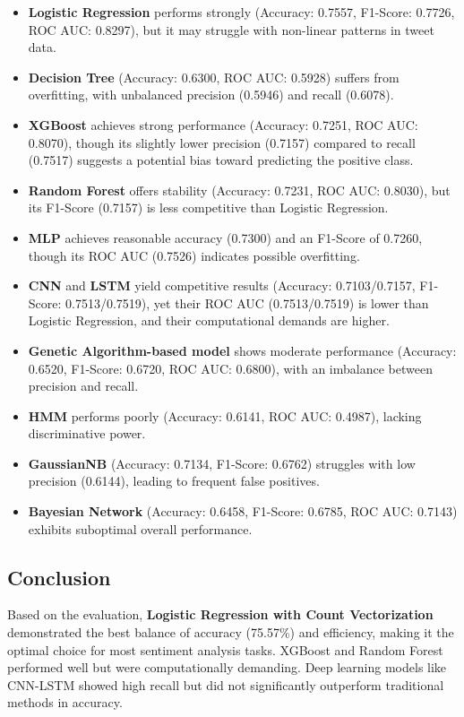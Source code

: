 \begin{itemize}
    \item \textbf{Logistic Regression} performs strongly (Accuracy: 0.7557, F1-Score: 0.7726, ROC AUC: 0.8297), but it may struggle with non-linear patterns in tweet data.
    \item \textbf{Decision Tree} (Accuracy: 0.6300, ROC AUC: 0.5928) suffers from overfitting, with unbalanced precision (0.5946) and recall (0.6078).
    \item \textbf{XGBoost} achieves strong performance (Accuracy: 0.7251, ROC AUC: 0.8070), though its slightly lower precision (0.7157) compared to recall (0.7517) suggests a potential bias toward predicting the positive class.
    \item \textbf{Random Forest} offers stability (Accuracy: 0.7231, ROC AUC: 0.8030), but its F1-Score (0.7157) is less competitive than Logistic Regression.
    \item \textbf{MLP} achieves reasonable accuracy (0.7300) and an F1-Score of 0.7260, though its ROC AUC (0.7526) indicates possible overfitting.
    \item \textbf{CNN} and \textbf{LSTM} yield competitive results (Accuracy: 0.7103/0.7157, F1-Score: 0.7513/0.7519), yet their ROC AUC (0.7513/0.7519) is lower than Logistic Regression, and their computational demands are higher.
    \item \textbf{Genetic Algorithm-based model} shows moderate performance (Accuracy: 0.6520, F1-Score: 0.6720, ROC AUC: 0.6800), with an imbalance between precision and recall.
    \item \textbf{HMM} performs poorly (Accuracy: 0.6141, ROC AUC: 0.4987), lacking discriminative power.
    \item \textbf{GaussianNB} (Accuracy: 0.7134, F1-Score: 0.6762) struggles with low precision (0.6144), leading to frequent false positives.
    \item \textbf{Bayesian Network} (Accuracy: 0.6458, F1-Score: 0.6785, ROC AUC: 0.7143) exhibits suboptimal overall performance.
\end{itemize}

\subsection{Conclusion}

Based on the evaluation, \textbf{Logistic Regression with Count Vectorization} demonstrated the best balance of accuracy (75.57\%) and efficiency, making it the optimal choice for most sentiment analysis tasks. XGBoost and Random Forest performed well but were computationally demanding. Deep learning models like CNN-LSTM showed high recall but did not significantly outperform traditional methods in accuracy.

